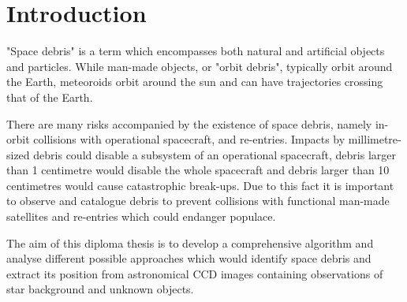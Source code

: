 \chapter{Introduction}\label{chap:intro}

"Space debris" is a term which encompasses both natural and artificial objects and particles. While man-made objects, or "orbit debris", typically orbit around the Earth, meteoroids orbit around the sun and can have trajectories crossing that of the Earth. 

There are many risks accompanied by the existence of space debris, namely in-orbit collisions with operational spacecraft, and re-entries. Impacts by millimetre-sized debris could disable a subsystem of an operational spacecraft, debris larger than 1 centimetre would disable the whole spacecraft and debris larger than 10 centimetres would cause catastrophic break-ups. Due to this fact it is important to observe and catalogue debris to prevent collisions with functional man-made satellites and re-entries which could endanger populace.

The aim of this diploma thesis is to develop a comprehensive algorithm and analyse different possible approaches which would identify space debris and extract its position from astronomical CCD images containing observations of star background and unknown objects.